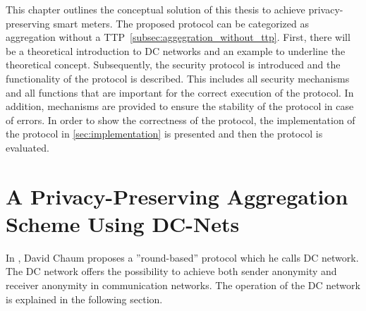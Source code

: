 
This chapter outlines the conceptual solution of this thesis to achieve privacy-preserving smart meters. The proposed protocol can be categorized as aggregation without a \gls{TTP}~\ref{subsec:aggegration_without_ttp}. First, there will be a theoretical introduction to DC networks and an example to underline the theoretical concept. Subsequently, the security protocol is introduced and the functionality of the protocol is described. This includes all security mechanisms and all functions that are important for the correct execution of the protocol. In addition, mechanisms are provided to ensure the stability of the protocol in case of errors. In order to show the correctness of the protocol, the implementation of the protocol in \ref{sec:implementation} is presented and then the protocol is evaluated.

\section{A Privacy-Preserving Aggregation Scheme Using DC-Nets}
In \cite{chaum1988dining}, David Chaum proposes a ''round-based'' protocol which he calls DC network. The DC network offers the possibility to achieve both sender anonymity and receiver anonymity in communication networks. The operation of the DC network is explained in the following section.
